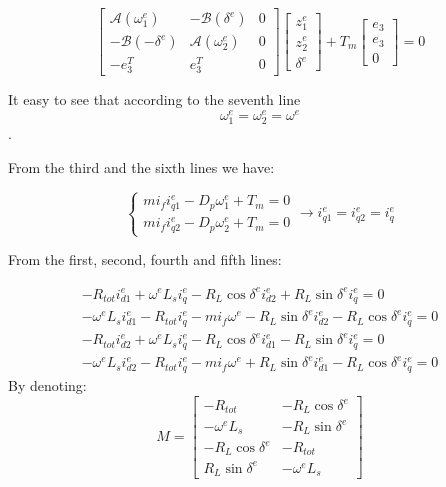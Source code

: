 \documentclass[conference]{IEEEtran}
\begin{document}
\begin{equation}
\left[\begin{array}{c|c|c}
\mathcal{A}(\omega_{1}^{e}) & -\mathcal{B}(\delta^{e}) & 0\\
\hline -\mathcal{B}(-\delta^{e}) & \mathcal{A}(\omega_{2}^{e}) & 0\\
\hline -e_{3}^{T} & e_{3}^{T} & 0
\end{array}\right]\left[\begin{array}{c}
z_{1}^{e}\\
z_{2}^{e}\\
\delta^{e}
\end{array}\right]+T_{m}\left[\begin{array}{c}
e_{3}\\
e_{3}\\
0
\end{array}\right]=0
\label{eq:algebricEquation}
\end{equation}

It easy to see that according to the seventh line $$\omega_{1}^{e}=\omega_{2}^{e}=\omega^{e}$$.

From the third and the sixth lines we have: 

$$
\left\{ \begin{array}{c}
mi_{f}i_{q1}^{e}-D_{p}\omega_{1}^{e}+T_{m}=0\\
mi_{f}i_{q2}^{e}-D_{p}\omega_{2}^{e}+T_{m}=0
\end{array}\right.\longrightarrow i_{q1}^{e}=i_{q2}^{e}=i_{q}^{e}
$$

From the first, second, fourth and fifth lines:

$$
 \begin{array}{c}
-R_{tot}i_{d1}^{e}+\omega^{e}L_{s}i_{q}^{e}-R_{L}\cos\delta^{e}i_{d2}^{e}+R_{L}\sin\delta^{e}i_{q}^{e}=0\\
-\omega^{e}L_{s}i_{d1}^{e}-R_{tot}i_{q}^{e}-mi_{f}\omega^{e}-R_{L}\sin\delta^{e}i_{d2}^{e}-R_{L}\cos\delta^{e}i_{q}^{e}=0\\
-R_{tot}i_{d2}^{e}+\omega^{e}L_{s}i_{q}^{e}-R_{L}\cos\delta^{e}i_{d1}^{e}-R_{L}\sin\delta^{e}i_{q}^{e}=0\\
-\omega^{e}L_{s}i_{d2}^{e}-R_{tot}i_{q}^{e}-mi_{f}\omega^{e}+R_{L}\sin\delta^{e}i_{d1}^{e}-R_{L}\cos\delta^{e}i_{q}^{e}=0
\end{array}
$$
By denoting:
\[
M=\left[\begin{array}{cc}
-R_{tot} & -R_{L}\cos\delta^{e}\\
-\omega^{e}L_{s} & -R_{L}\sin\delta^{e}\\
-R_{L}\cos\delta^{e} & -R_{tot}\\
R_{L}\sin\delta^{e} & -\omega^{e}L_{s}
\end{array}\right]
\]
\end{document}
